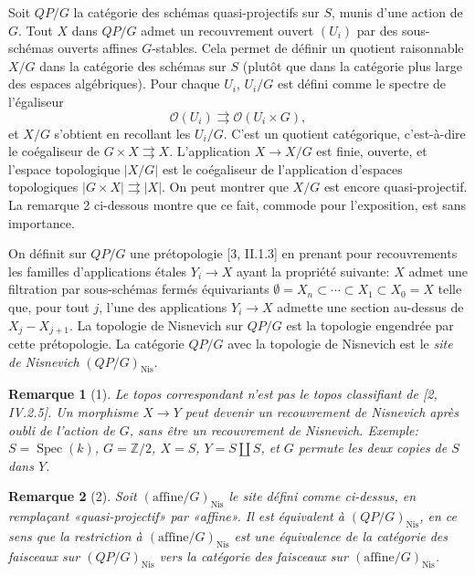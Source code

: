 \documentclass[11pt]{article}
\newcommand{\Z}{\mathbb Z}
\newcommand{\Nis}{\mathrm{Nis}}
\newcommand{\Spec}{\operatorname{Spec}}
\theoremstyle{deligne}
\newtheorem*{remark*}{Remarque}
\begin{document}
Soit \(QP/G\) la catégorie des schémas quasi-projectifs sur \(S\), munis d'une action de \(G\). Tout \(X\) dans \(QP/G\) admet un recouvrement ouvert \((U_i)\) par des sous-schémas ouverts affines \(G\)-stables. Cela permet de définir un quotient raisonnable \(X/G\) dans la catégorie des schémas sur \(S\) (plutôt que dans la catégorie plus large des espaces algébriques). Pour chaque \(U_i\), \(U_i/G\) est défini comme le spectre de l'égaliseur
\[
\mathcal O(U_i)\rightrightarrows\mathcal O(U_i\times G),
\]
et \(X/G\) s'obtient en recollant les \(U_i/G\). C'est un quotient catégorique, c'est-à-dire le coégaliseur de \(G\times X\rightrightarrows X\). L'application \(X\to X/G\) est finie, ouverte, et l'espace topologique \(|X/G|\) est le coégaliseur de l'application d'espaces topologiques \(|G\times X|\rightrightarrows |X|\). On peut montrer que \(X/G\) est encore quasi-projectif. La remarque 2 ci-dessous montre que ce fait, commode pour l'exposition, est sans importance.

On définit sur \(QP/G\) une prétopologie [3, II.1.3] en prenant pour recouvrements les familles d'applications étales \(Y_i\to X\) ayant la propriété suivante: \(X\) admet une filtration par sous-schémas fermés équivariants \(\emptyset=X_n\subset\cdots\subset X_1\subset X_0=X\) telle que, pour tout \(j\), l'une des applications \(Y_i\to X\) admette une section au-dessus de \(X_j-X_{j+1}\). La topologie de Nisnevich sur \(QP/G\) est la topologie engendrée par cette prétopologie. La catégorie \(QP/G\) avec la topologie de Nisnevich est le \emph{site de Nisnevich} \((QP/G)_{\Nis}\).

\begin{remark*}[1]
Le topos correspondant n'est pas le topos classifiant de [2, IV.2.5]. Un morphisme \(X\to Y\) peut devenir un recouvrement de Nisnevich après oubli de l'action de \(G\), sans être un recouvrement de Nisnevich. Exemple: \(S=\Spec(k)\), \(G=\Z/2\), \(X=S\), \(Y=S\coprod S\), et \(G\) permute les deux copies de \(S\) dans \(Y\).
\end{remark*}

\begin{remark*}[2]
Soit \((\mathrm{affine}/G)_{\Nis}\) le site défini comme ci-dessus, en remplaçant «quasi-projectif» par «affine». Il est équivalent à \((QP/G)_{\Nis}\), en ce sens que la restriction à \((\mathrm{affine}/G)_{\Nis}\) est une équivalence de la catégorie des faisceaux sur \((QP/G)_{\Nis}\) vers la catégorie des faisceaux sur \((\mathrm{affine}/G)_{\Nis}\).
\end{remark*}
\end{document}
